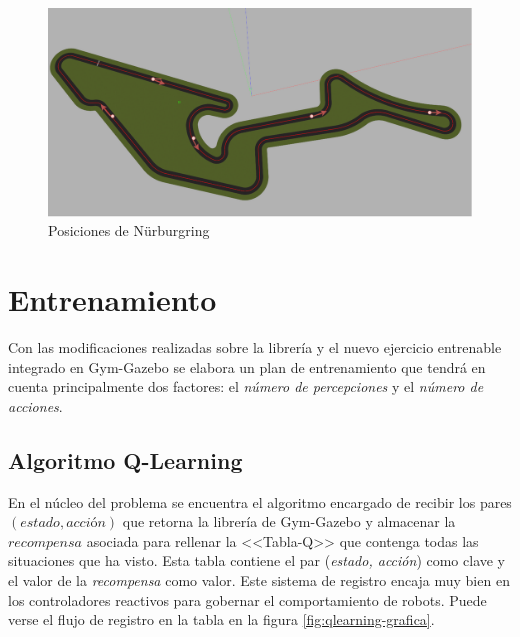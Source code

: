 \begin{figure}[!ht]
    \centering \includegraphics[width=0.8\columnwidth]{./figures/chapter_4/nurburgring_reinicios.png}
    \caption{Posiciones de Nürburgring}\label{fig:reinicios-nurburgring}
\end{figure}

\section{Entrenamiento}

Con las modificaciones realizadas sobre la librería y el nuevo ejercicio entrenable integrado en Gym-Gazebo se elabora un plan de entrenamiento que tendrá en cuenta principalmente dos factores: el \textit{número de percepciones} y el \textit{número de acciones}.

\subsection{Algoritmo Q-Learning}\label{qlearning}

En el núcleo del problema se encuentra el algoritmo encargado de recibir los pares $(estado, acción)$ que retorna la librería de Gym-Gazebo y almacenar la $recompensa$ asociada para rellenar la <<Tabla-Q>> que contenga todas las situaciones que ha visto. Esta tabla contiene el par (\textit{estado, acción}) como clave y el valor de la \textit{recompensa} como valor. Este sistema de registro encaja muy bien en los controladores reactivos para gobernar el comportamiento de robots. Puede verse el flujo de registro en la tabla en la figura \ref{fig:qlearning-grafica}.\\

